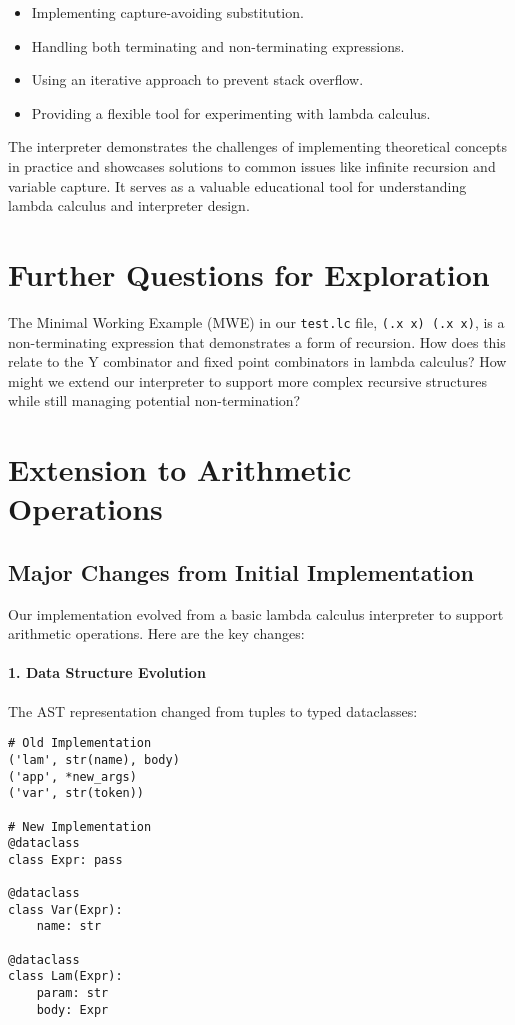 \begin{itemize}
    \item Implementing capture-avoiding substitution.
    \item Handling both terminating and non-terminating expressions.
    \item Using an iterative approach to prevent stack overflow.
    \item Providing a flexible tool for experimenting with lambda calculus.
\end{itemize}

The interpreter demonstrates the challenges of implementing theoretical concepts in practice and showcases solutions to common issues like infinite recursion and variable capture. It serves as a valuable educational tool for understanding lambda calculus and interpreter design.

\section{Further Questions for Exploration}

The Minimal Working Example (MWE) in our \texttt{test.lc} file, \texttt{(\x.x x) (\x.x x)}, is a non-terminating expression that demonstrates a form of recursion. How does this relate to the Y combinator and fixed point combinators in lambda calculus? How might we extend our interpreter to support more complex recursive structures while still managing potential non-termination?

\section{Extension to Arithmetic Operations}

\subsection{Major Changes from Initial Implementation}

Our implementation evolved from a basic lambda calculus interpreter to support arithmetic operations. Here are the key changes:

\paragraph{1. Data Structure Evolution}
The AST representation changed from tuples to typed dataclasses:
\begin{verbatim}
# Old Implementation
('lam', str(name), body)
('app', *new_args)
('var', str(token))

# New Implementation
@dataclass
class Expr: pass

@dataclass
class Var(Expr):
    name: str

@dataclass
class Lam(Expr):
    param: str
    body: Expr
\end{verbatim}

